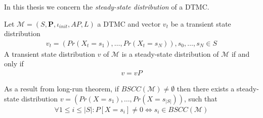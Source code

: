 In this thesis we concern the \textit{steady-state distribution} of a DTMC.
\begin{definition}
    Let $\mathcal{M}=(S,\mathbf{P}, \iota_{init}, AP,L)$ a DTMC and vector $v_t$ be a transient state distribution
    \begin{align*}
        v_t = (Pr(X_t=s_1),\ldots,Pr(X_t=s_N)), s_0,\ldots,s_N \in S
    \end{align*}
    A transient state distribution $v$ of $\mathcal{M}$ is a steady-state distribution of $\mathcal{M}$ if and only if
    \begin{align*}
        v = vP
    \end{align*}
\end{definition}
As a result from long-run theorem, if $BSCC(\mathcal{M})\neq \emptyset$ then there exists a
steady-state distribution $v = (Pr(X=s_1),\ldots,Pr(X=s_{|S|}))$, such that
\begin{align*}
    \forall 1 \leq i \leq |S|: P[X=s_i] \neq 0 \Leftrightarrow s_i \in BSCC(\mathcal{M})
\end{align*}


